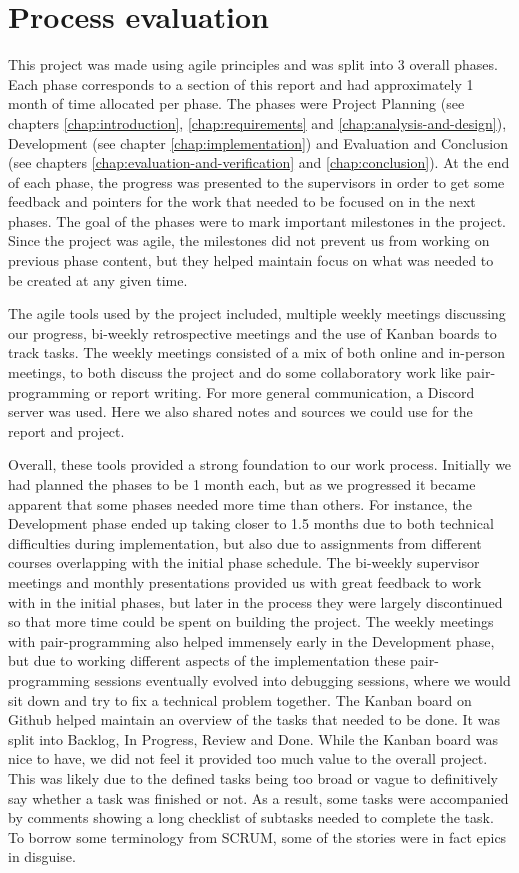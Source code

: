 \section{Process evaluation}
\label{sec:process-evaluation}

This project was made using agile principles and was split into 3 overall phases. Each phase corresponds to a section of
this report and had approximately 1 month of time allocated per phase. The phases were Project Planning 
(see chapters \ref{chap:introduction}, \ref{chap:requirements} and \ref{chap:analysis-and-design}), Development 
(see chapter \ref{chap:implementation}) and Evaluation and Conclusion (see chapters \ref{chap:evaluation-and-verification} 
and \ref{chap:conclusion}). At the end of each phase, the progress was presented to the supervisors in order to get some 
feedback and pointers for the work that needed to be focused on in the next phases. The goal of the phases were to mark 
important milestones in the project. Since the project was agile, the milestones did not prevent us from working on 
previous phase content, but they helped maintain focus on what was needed to be created at any given time.

The agile tools used by the project included, multiple weekly meetings discussing our progress, bi-weekly retrospective 
meetings and the use of Kanban boards to track tasks. The weekly meetings consisted of a mix of both online and in-person
meetings, to both discuss the project and do some collaboratory work like pair-programming or report writing. For more 
general communication, a Discord server was used. Here we also shared notes and sources we could use for the report and 
project.

Overall, these tools provided a strong foundation to our work process. Initially we had planned the phases to be 1 month
each, but as we progressed it became apparent that some phases needed more time than others. For instance, the
Development phase ended up taking closer to 1.5 months due to both technical difficulties during implementation, but also
due to assignments from different courses overlapping with the initial phase schedule.
The bi-weekly supervisor meetings and monthly presentations provided us with great feedback to work with in the initial
phases, but later in the process they were largely discontinued so that more time could be spent on building the project.
The weekly meetings with pair-programming also helped immensely early in the Development phase, but due to working different
aspects of the implementation these pair-programming sessions eventually evolved into debugging sessions, where we would
sit down and try to fix a technical problem together.
The Kanban board on Github helped maintain an overview of the tasks that needed to be done. It was split into Backlog, In Progress,
Review and Done. While the Kanban board was nice to have, we did not feel it provided too much value to the overall project.
This was likely due to the defined tasks being too broad or vague to definitively say whether a task was finished or not.
As a result, some tasks were accompanied by comments showing a long checklist of subtasks needed to complete the task. 
To borrow some terminology from SCRUM, some of the stories were in fact epics in disguise.
